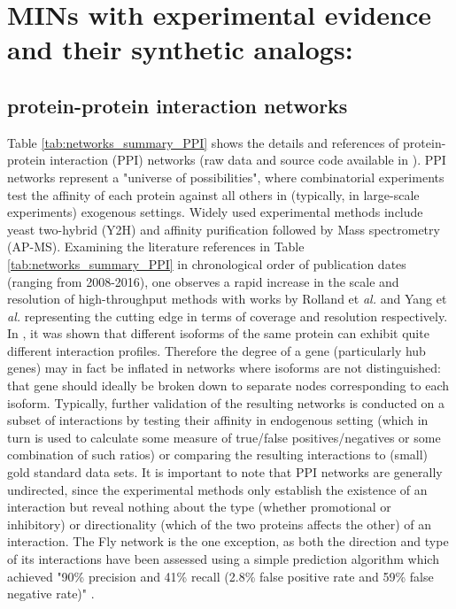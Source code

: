 \documentclass[12pt]{article}	%
\begin{document}
\newpage
\section{MINs with experimental evidence and their synthetic analogs: }\label{sup_realnets}
\subsection{protein-protein interaction networks}\label{sec:data_DB_nets}
    Table \ref{tab:networks_summary_PPI}  shows the details and references of protein-protein interaction (PPI) networks (raw data and source code available in  \cite{atiia_case-study_2017}).
    PPI networks represent a "universe of possibilities", where combinatorial experiments test the affinity of each protein against all others in (typically, in large-scale experiments) exogenous settings. Widely used experimental methods include yeast two-hybrid (Y2H) and affinity purification followed by Mass spectrometry (AP-MS). Examining the literature references in Table \ref{tab:networks_summary_PPI} in chronological order of publication dates (ranging from 2008-2016), one observes a rapid increase in the scale  and resolution  of high-throughput methods with works by Rolland et \textit{al.}  \cite{rolland_proteome-scale_2014} and Yang et \textit{al.}  \cite{yang_widespread_2016} representing the cutting edge in terms of coverage and resolution respectively.
    In  \cite{yang_widespread_2016}, it was shown that different isoforms of the same protein can exhibit quite different interaction profiles. Therefore the degree of a gene (particularly hub genes) may in fact be inflated in networks where isoforms are not distinguished: that gene should ideally be broken down to separate nodes corresponding to each isoform.
    Typically, further validation of the resulting networks is conducted on a subset of interactions by testing their affinity in endogenous setting (which in turn is used to calculate some measure of true/false positives/negatives or some combination of such ratios) or comparing the resulting interactions to (small) gold standard data sets. It is important to note that PPI networks are generally undirected, since the experimental methods only establish the existence of an interaction but reveal nothing about the type (whether promotional or inhibitory) or directionality (which of the two proteins affects the other) of an interaction. The Fly network is the one exception, as both the direction and type of its interactions have been assessed using a simple prediction algorithm which achieved "90\% precision and 41\% recall (2.8\% false positive rate and 59\% false negative rate)"  \cite{vinayagam_integrating_2014}.
\end{document}
